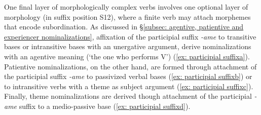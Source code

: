 One final layer of morphologically complex verbs involves one optional layer of morphology (in suffix position S12), where a finite verb may attach morphemes that encode subordination. As discussed in §\ref{subsec: agentive, patientive and experiencer nominalizations}, affixation of the participial suffix \textit{-ame} to transitive bases or intransitive bases with an unergative argument, derive nominalizations with an agentive meaning (‘the one who performs V’) (\ref{ex: participial suffixa}). Patientive nominalizations, on the other hand, are formed through attachment of the participial suffix \textit{-ame} to passivized verbal bases (\ref{ex: participial suffixb}) or to intransitive verbs with a theme as subject argument (\ref{ex: participial suffixc}). Finally, theme nominalizations are derived though attachment of the participial \textit{-ame} suffix to a medio-passive base (\ref{ex: participial suffixd}).

\ea\label{ex: participial suffix}

